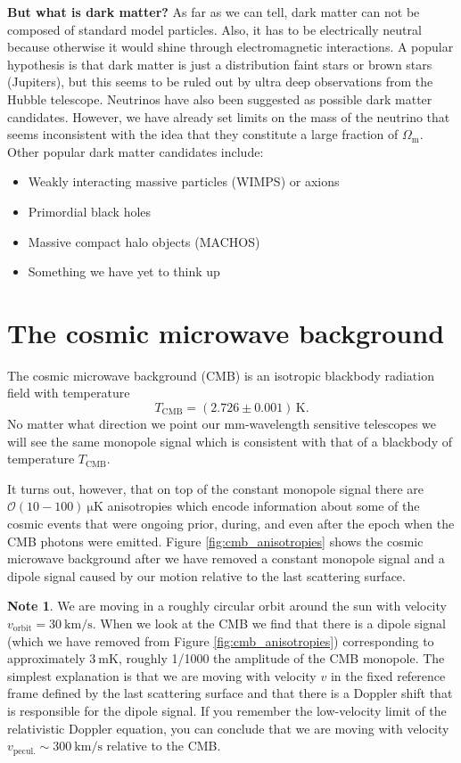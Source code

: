 \documentclass[a4paper,12pt]{article}
\theoremstyle{remark}
\newcommand{\mrm}[1]{\mathrm{#1}}
\renewcommand{\=}[1]{\stackrel{#1}{=}} %
\theoremstyle{plain}
\theoremstyle{definition}
\newtheorem*{definitionT}{Note}%
\newenvironment{note}{
\begin{dBox}
\begin{definitionT}}
{\end{definitionT}
\end{dBox}}
\begin{document}
\textbf{But what is dark matter?} As far as we can tell, dark matter can not be composed of standard model particles. Also, it has to be electrically neutral because otherwise it would shine through electromagnetic interactions. A popular hypothesis is that dark matter is just a distribution faint stars or brown stars (Jupiters), but this seems to be ruled out by ultra deep observations from the Hubble telescope. Neutrinos have also been suggested as possible dark matter candidates. However, we have already set limits on the mass of the neutrino that seems inconsistent with the idea that they constitute a large fraction of $\Omega _\mrm{m}$.
Other popular dark matter candidates include:
\vspace{-5mm}
\begin{itemize}
\item Weakly interacting massive particles (WIMPS) or axions
\item Primordial black holes
\item Massive compact halo objects (MACHOS)
\item Something we have yet to think up
\end{itemize}


\section{The cosmic microwave background}
The cosmic microwave background (CMB) is an isotropic blackbody radiation field with temperature 
\begin{equation}
T_\mrm{CMB} = (2.726 \pm 0.001) \,\mrm{K}.
\end{equation}
No matter what direction we point our mm-wavelength sensitive telescopes we will see the same monopole signal which is consistent with that of a blackbody of temperature $T_\mrm{CMB}$. 

It turns out, however, that on top of the constant monopole signal there are $\mathcal{O}(10-100) \:\mrm{\mu K}$ anisotropies which encode information about some of the cosmic events that were ongoing prior, during, and even after the epoch when the CMB photons were emitted. Figure \ref{fig:cmb_anisotropies} shows the cosmic microwave background after we have removed a constant monopole signal and a dipole signal caused by our motion relative to the last scattering surface.

\begin{note}
We are moving in a roughly circular orbit around the sun with velocity $v_\mrm{orbit} = 30 \:\mrm{km/s}$. When we look at the CMB we find that there is a dipole signal (which we have removed from Figure \ref{fig:cmb_anisotropies}) corresponding to approximately $3 \:\mrm{mK}$, roughly 1/1000 the amplitude of the CMB monopole. The simplest explanation is that we are moving with velocity $v$ in the fixed reference frame defined by the last scattering surface and that there is a Doppler shift that is responsible for the dipole signal. If you remember the low-velocity limit of the relativistic Doppler equation, you can conclude that we are moving with velocity $v_\mrm{pecul.} \sim 300 \:\mrm{km/s}$ relative to the CMB.
\end{note}
\end{document}
